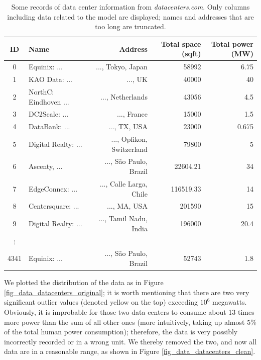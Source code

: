 \documentclass[12pt]{article}
\begin{document}
\begin{table}[!t]
	\centering
	\caption{Some records of data center information from \textit{datacenters.com}. Only columns including data related to the model are displayed; names and addresses that are too long are truncated.}
	\label{table_data_datacenters.com}
	\small
	\begin{tabular}{clrrr}
		\hline
		\textbf{ID} & \textbf{Name} & \textbf{Address} & \textbf{Total space} (sqft) & \textbf{Total power} (MW) \\
		\hline
		0 & Equinix: ... & ..., Tokyo, Japan & 58992 & 6.75 \\
		1 & KAO Data: ... & ..., UK & 40000 & 40 \\
		2 & NorthC: Eindhoven ... & ..., Netherlands & 43056 & 4.5 \\
		3 & DC2Scale: ... & ..., France & 15000 & 1.5 \\
		4 & DataBank: ... & ..., TX, USA & 23000 & 0.675 \\
		5 & Digital Realty: ... & ..., Opfikon, Switzerland & 79800 & 5 \\
		6 & Ascenty, ... & ..., São Paulo, Brazil & 22604.21 & 34 \\
		7 & EdgeConnex: ... & ..., Calle Larga, Chile & 116519.33 & 14 \\
		8 & Centersquare: ... & ..., MA, USA & 201590 & 15 \\
		9 & Digital Realty: ... & ..., Tamil Nadu, India & 196000 & 20.4 \\
		$\vdots$ &&&& \\
		4341 & Equinix: ... & ..., São Paulo, Brazil & 52743 & 1.8 \\
		\hline
	\end{tabular}
\end{table}

We plotted the distribution of the data as in Figure \ref{fig_data_datacenters_original}; it is worth mentioning that there are two very significant outlier values (denoted yellow on the top) exceeding $10^6$ megawatts. Obviously, it is improbable for those two data centers to consume about 13 times more power than the sum of all other ones (more intuitively, taking up almost 5\% of the total human power consumption); therefore, the data is very possibly incorrectly recorded or in a wrong unit. We thereby removed the two, and now all data are in a reasonable range, as shown in Figure \ref{fig_data_datacenters_clean}.
\end{document}
